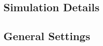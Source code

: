 \begin{spacing}{2.0}
    \section{Simulation Details}

    \subsection{General Settings}

    \lipsum[2]
\end{spacing}
